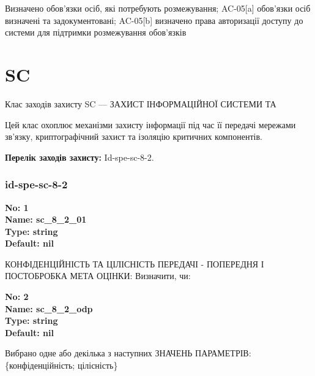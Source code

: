 \documentclass{article}
\begin{document}
{\footnotesize Визначено обов'язки осіб, які потребують розмежування; AC-05[a] обов'язки осіб визначені та задокументовані; AC-05[b] визначено права авторизації доступу до системи для підтримки розмежування обов'язків}




\section{SC}
Клас заходів захисту SC --- ЗАХИСТ ІНФОРМАЦІЙНОЇ СИСТЕМИ ТА

Цей клас охоплює механізми захисту інформації під час її передачі мережами зв'язку, криптографічний захист та ізоляцію критичних компонентів.

\textbf{Перелік заходів захисту:} Id-spe-sc-8-2.

\subsubsection{id-spe-sc-8-2}


\vspace{10pt}
{\footnotesize\bfseries
No: 1\\
Name: sc\_\allowbreak{}8\_\allowbreak{}2\_\allowbreak{}01\\
Type: string\\
Default: nil
}

{\footnotesize КОНФІДЕНЦІЙНІСТЬ ТА ЦІЛІСНІСТЬ ПЕРЕДАЧІ - ПОПЕРЕДНЯ І ПОСТОБРОБКА МЕТА ОЦІНКИ: Визначити, чи:}


{\footnotesize\bfseries
No: 2\\
Name: sc\_\allowbreak{}8\_\allowbreak{}2\_\allowbreak{}odp\\
Type: string\\
Default: nil
}

{\footnotesize Вибрано одне або декілька з наступних ЗНАЧЕНЬ ПАРАМЕТРІВ: \{конфіденційність; цілісність\}}
\end{document}
